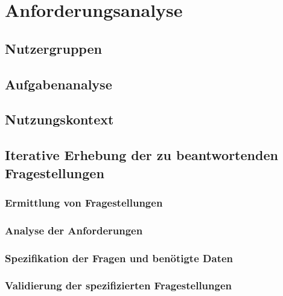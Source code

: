 \chapter{Anforderungsanalyse}
\label{anforderungsanalyse}
\lipsum[1-52]
\section{Nutzergruppen}

\section{Aufgabenanalyse}

\section{Nutzungskontext}

\section{Iterative Erhebung der zu beantwortenden Fragestellungen}
\subsection{Ermittlung von Fragestellungen}
\subsection{Analyse der Anforderungen}
\subsection{Spezifikation der Fragen und benötigte Daten}
\subsection{Validierung der spezifizierten Fragestellungen}